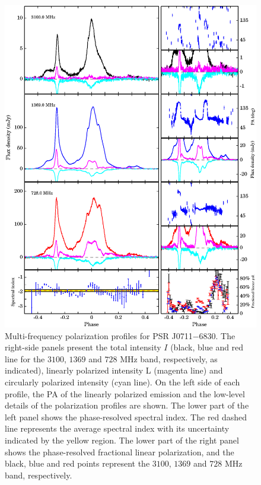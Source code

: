 \documentclass[useAMS,usenatbib]{mn2e}
\begin{document}
\begin{figure}
\begin{center}
\includegraphics[width=6 in]{0711.ps}
\caption{Multi-frequency polarization profiles for PSR J0711$-$6830. 
The right-side panels present the total intensity $I$ (black, blue and red
line for the $3100$, $1369$ and $728$ MHz band, respectively, as 
indicated), linearly polarized intensity L (magenta line) and circularly 
polarized intensity (cyan line).
%
On the left side of each profile, the PA of the linearly polarized 
emission and the low-level details of the polarization profiles are 
shown.
%
The lower part of the left panel shows the phase-resolved spectral index. 
The red dashed line represents the average spectral index with its uncertainty 
indicated by the yellow region.
%
The lower part of the right panel shows the phase-resolved fractional linear 
polarization, and the black, blue and red points represent the $3100$, $1369$ 
and $728$ MHz band, respectively. 
}
\label{0711}
\end{center}
\end{figure}
\end{document}
